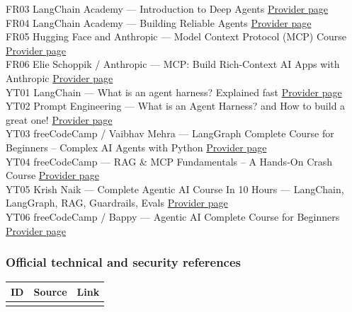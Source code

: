 \documentclass[
  10pt,
]{article}
\begin{document}
FR03 \textbar{} LangChain Academy --- Introduction to Deep Agents
\textbar{}
\href{https://academy.langchain.com/courses/foundation-introduction-to-deepagents}{Provider
page} \textbar{}\\
FR04 \textbar{} LangChain Academy --- Building Reliable Agents
\textbar{}
\href{https://academy.langchain.com/courses/building-reliable-agents}{Provider
page} \textbar{}\\
FR05 \textbar{} Hugging Face and Anthropic --- Model Context Protocol
(MCP) Course \textbar{}
\href{https://huggingface.co/learn/mcp-course/unit0/introduction}{Provider
page} \textbar{}\\
FR06 \textbar{} Elie Schoppik / Anthropic --- MCP: Build Rich-Context AI
Apps with Anthropic \textbar{}
\href{https://www.deeplearning.ai/courses/mcp-build-rich-context-ai-apps-with-anthropic}{Provider
page} \textbar{}\\
YT01 \textbar{} LangChain --- What is an agent harness? Explained fast
\textbar{} \href{https://www.youtube.com/watch?v=7dFvU9zuv0k}{Provider
page} \textbar{}\\
YT02 \textbar{} Prompt Engineering --- What is an Agent Harness? and How
to build a great one! \textbar{}
\href{https://www.youtube.com/watch?v=nWzXyjXCoCE}{Provider page}
\textbar{}\\
YT03 \textbar{} freeCodeCamp / Vaibhav Mehra --- LangGraph Complete
Course for Beginners -- Complex AI Agents with Python \textbar{}
\href{https://www.youtube.com/watch?v=jGg_1h0qzaM}{Provider page}
\textbar{}\\
YT04 \textbar{} freeCodeCamp --- RAG \& MCP Fundamentals -- A Hands-On
Crash Course \textbar{}
\href{https://www.youtube.com/watch?v=I7_WXKhyGms}{Provider page}
\textbar{}\\
YT05 \textbar{} Krish Naik --- Complete Agentic AI Course In 10 Hours
--- LangChain, LangGraph, RAG, Guardrails, Evals \textbar{}
\href{https://www.youtube.com/watch?v=rV3HJ4LEZ7k}{Provider page}
\textbar{}\\
YT06 \textbar{} freeCodeCamp / Bappy --- Agentic AI Complete Course for
Beginners \textbar{}
\href{https://www.youtube.com/watch?v=Zy7EXDONlTY}{Provider page}
\textbar{}

\subsubsection{Official technical and security
references}\label{official-technical-and-security-references}

\begin{longtable}[]{@{}lll@{}}
\toprule\noalign{}
ID & Source & Link \\
\midrule\noalign{}
\endhead
\bottomrule\noalign{}
\endlastfoot
\end{longtable}
\end{document}
